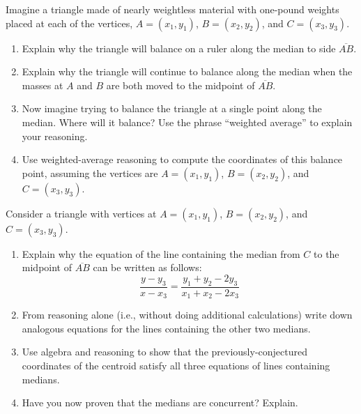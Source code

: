 \documentclass[nooutcomes]{ximera}
\begin{document}
\begin{problem}
Imagine a triangle made of nearly weightless material with one-pound weights placed at each of the vertices, $A=(x_1, y_1)$, $B=(x_2, y_2)$, and $C=(x_3, y_3)$.  
\begin{enumerate}
\item Explain why the triangle will balance on a ruler along the median to side $\overline{AB}$.  
\vfill
\item Explain why the triangle will continue to balance along the median when the masses at $A$ and $B$ are both moved to the midpoint of $\overline{AB}$.  
\vfill
\item Now imagine trying to balance the triangle at a single point along the median.  Where will it balance?  Use the phrase ``weighted average'' to explain your reasoning.   
\vfill
\item Use weighted-average reasoning to compute the coordinates of this balance point, assuming the vertices are $A=(x_1, y_1)$, $B=(x_2, y_2)$, and $C=(x_3, y_3)$.
\vfill
\end{enumerate}
\end{problem}

\newpage
\begin{problem}
Consider a triangle with vertices at $A=(x_1, y_1)$, $B=(x_2, y_2)$, and $C=(x_3, y_3)$.  
\begin{enumerate}
\item Explain why the equation of the line containing the median from $C$ to the midpoint of $\overline{AB}$ can be written as follows:  
$$\frac{y-y_3}{x-x_3}=\frac{y_1+y_2-2y_3}{x_1+x_2-2x_3}$$
\vfill
\item From reasoning alone (i.e., without doing additional calculations) write down analogous equations for the lines containing the other two medians. 
\vfill
\item Use algebra and reasoning to show that the previously-conjectured coordinates of the centroid satisfy all three equations of lines containing medians.  
\vfill
\item Have you now proven that the medians are concurrent?  Explain.
\vfill
\end{enumerate}
\end{problem}
\end{document}

